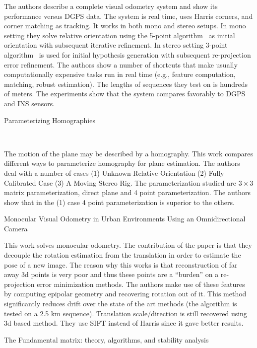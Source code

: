 \documentclass[10pt]{article}         %
\begin{document}
\begin{enumerate}
  The authors describe a complete visual odometry system and show its
  performance versus DGPS data.  The system is real time, uses Harris
  corners, and corner matching as tracking.  It works in both mono and
  stereo setups. In mono setting they solve relative orientation using
  the 5-point algorithm~\cite{nister2004efficient} as initial
  orientation with subsequent iterative refinement. In stereo setting
  3-point algorithm~\cite{haralick1991analysis} is used for initial
  hypothesis generation with subsequent re-projection error
  refinement.  The authors show a number of shortcuts that make
  usually computationally expensive tasks run in real time
  (e.g., feature computation, matching, robust estimation).  The
  lengths of sequences they test on is hundreds of meters.  The
  experiments show that the system compares favorably to DGPS and INS
  sensors.

  {\Large \item Parameterizing
    Homographies}~\cite{baker2006parameterizing}

  The motion of the plane may be described by a homography.  This work
  compares different ways to parameterize homography for plane
  estimation.  The authors deal with a number of cases (1) Unknown
  Relative Orientation (2) Fully Calibrated Case (3) A Moving Stereo
  Rig.  The parameterization studied are $3\times 3$ matrix
  parameterization, direct plane and 4 point parameterization.  The
  authors show that in the (1) case 4 point parameterization is
  superior to the others.

  {\Large \item Monocular Visual Odometry in Urban Environments Using
    an Omnidirectional Camera} \cite{tardif2008monocular}

  This work solves monocular odometry.  The contribution of the paper
  is that they decouple the rotation estimation from the translation
  in order to estimate the pose of a new image.  The reason why this
  works is that reconstruction of far away 3d points is very poor and
  thus these points are a ``burden'' on a re-projection error
  minimization methods.  The authors make use of these features by
  computing epipolar geometry and recovering rotation out of it.  This
  method significantly reduces drift over the state of the art methods
  (the algorithm is tested on a 2.5 km sequence).  Translation
  scale/direction is still recovered using 3d based method.  They use
  SIFT instead of Harris since it gave better results.

  {\Large \item The Fundamental matrix: theory, algorithms, and
    stability analysis}~\cite{luong1996fundamental}


\end{enumerate}
\end{document}
